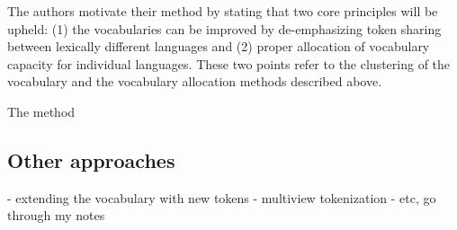 The authors motivate their method by stating that two core principles will be upheld: (1) the vocabularies can be improved by de-emphasizing token sharing between lexically different languages and (2) proper allocation of vocabulary capacity for individual languages. These two points refer to the clustering of the vocabulary and the vocabulary allocation methods described above.

The method 


\subsection{Other approaches}

- extending the vocabulary with new tokens
- multiview tokenization
- etc, go through my notes

